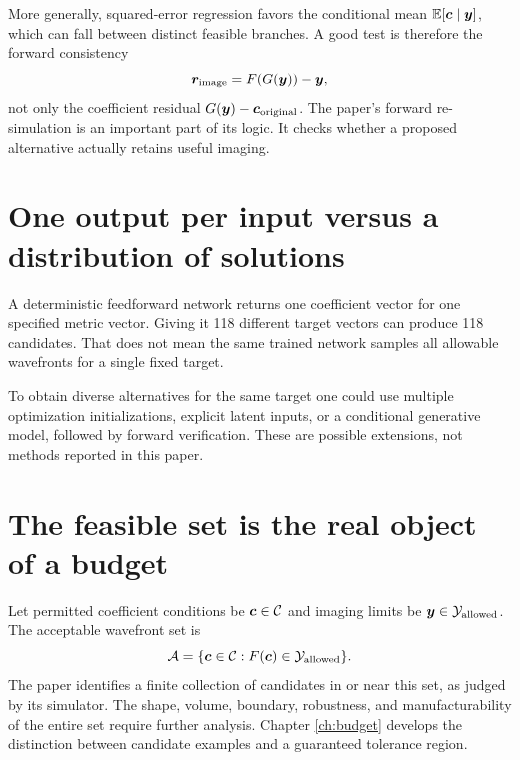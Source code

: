 More generally, squared-error regression favors the conditional mean
$\mathbb{E}[\bm{c}\mid\bm{y}]$, which can fall between distinct feasible branches.
A good test is therefore the forward consistency
\begin{equation}
\bm{r}_{\rm image}=F(G(\bm{y}))-\bm{y},
\label{eq:forwardconsistency}
\end{equation}
not only the coefficient residual $G(\bm{y})-\bm{c}_{\rm original}$.
The paper's forward re-simulation is an important part of its logic.
It checks whether a proposed alternative actually retains useful imaging.

\section{One output per input versus a distribution of solutions}
A deterministic feedforward network returns one coefficient vector
for one specified metric vector. Giving it 118 different target vectors
can produce 118 candidates. That does not mean the same trained network
samples all allowable wavefronts for a single fixed target.

To obtain diverse alternatives for the same target one could use multiple
optimization initializations, explicit latent inputs, or a conditional
generative model, followed by forward verification. These are possible
extensions, not methods reported in this paper.

\section{The feasible set is the real object of a budget}
Let permitted coefficient conditions be $\bm{c}\in\mathcal C$ and
imaging limits be $\bm{y}\in\mathcal Y_{\rm allowed}$.
The acceptable wavefront set is
\begin{equation}
\mathcal A=\{\bm{c}\in\mathcal C:F(\bm{c})\in\mathcal Y_{\rm allowed}\}.
\label{eq:feasibleset}
\end{equation}
The paper identifies a finite collection of candidates in or near this set,
as judged by its simulator. The shape, volume, boundary, robustness, and
manufacturability of the entire set require further analysis.
Chapter \ref{ch:budget} develops the distinction between candidate
examples and a guaranteed tolerance region.
